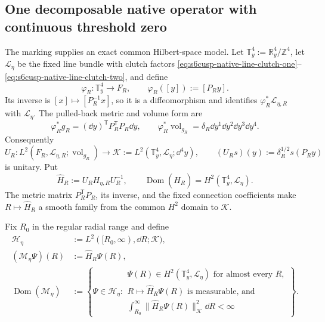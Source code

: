 \subsection{One decomposable native operator with continuous threshold zero}
\label{subsec:s6cusp-native-direct-integral}

The marking supplies an exact common Hilbert-space model.  Let
\(\mathbb T_y^4:=\mathbb R_y^4/\mathbb Z^4\), let \(\mathcal L_\eta\) be
the fixed line bundle with clutch factors
\eqref{eq:s6cusp-native-line-clutch-one}--
\eqref{eq:s6cusp-native-line-clutch-two}, and define
\begin{equation}\label{eq:s6cusp-native-marking-diffeomorphism}
 \varphi_R:\mathbb T_y^4\longrightarrow F_R,
 \qquad
 \varphi_R([y]):=[P_Ry].
\end{equation}
Its inverse is \([x]\mapsto[P_R^{-1}x]\), so it is a diffeomorphism and
identifies \(\varphi_R^*\mathcal L_{\eta,R}\) with \(\mathcal L_\eta\).
The pulled-back metric and volume form are
\begin{equation}\label{eq:s6cusp-native-pulled-metric-volume}
 \varphi_R^*g_R=(\dd y)^{\mathsf T}P_R^{\mathsf T}P_R\dd y,
 \qquad
 \varphi_R^*\operatorname{vol}_{g_R}
 =\delta_R\dd y^1\dd y^2\dd y^3\dd y^4.
\end{equation}
Consequently
\begin{equation}\label{eq:s6cusp-native-marking-unitary}
 U_R:L^2(F_R,\mathcal L_{\eta,R};\operatorname{vol}_{g_R})
 \longrightarrow
 \mathscr K:=L^2(\mathbb T_y^4,\mathcal L_\eta;\dd^4y),
 \qquad
 (U_Rs)(y):=\delta_R^{1/2}s(P_Ry)
\end{equation}
is unitary.  Put
\begin{equation}\label{eq:s6cusp-native-fixed-fibre-operator}
 \widehat H_R:=U_RH_{\eta,R}U_R^{-1},
 \qquad
 \operatorname{Dom}(\widehat H_R)
 =H^2(\mathbb T_y^4,\mathcal L_\eta).
\end{equation}
The metric matrix \(P_R^{\mathsf T}P_R\), its inverse, and the fixed
connection coefficients make \(R\mapsto\widehat H_R\) a smooth family from
the common \(H^2\) domain to \(\mathscr K\).

Fix \(R_0\) in the regular radial range and define
\begin{align}
 \mathscr H_\eta
 &:=L^2([R_0,\infty),\dd R;\mathscr K),
 \label{eq:s6cusp-native-direct-integral-Hilbert}\\
 (\mathscr M_\eta\Psi)(R)&:=\widehat H_R\Psi(R),
 \label{eq:s6cusp-native-direct-integral-action}\\
 \operatorname{Dom}(\mathscr M_\eta)
 &:=\left\{\Psi\in\mathscr H_\eta:
 \begin{array}{l}
 \Psi(R)\in H^2(\mathbb T_y^4,\mathcal L_\eta)
 \text{ for almost every }R,\\
 R\mapsto\widehat H_R\Psi(R)\text{ is measurable, and}\\
 \displaystyle\int_{R_0}^{\infty}
 \lVert\widehat H_R\Psi(R)\rVert_{\mathscr K}^2\dd R<\infty
 \end{array}\right\}.
 \label{eq:s6cusp-native-direct-integral-domain}
\end{align}

